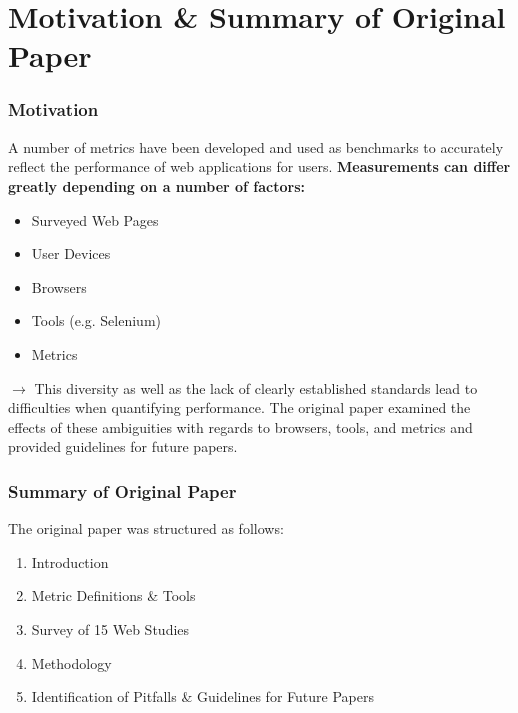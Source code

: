 \section{Motivation \& Summary of Original Paper}

\begin{frame}
    \frametitle{Motivation}
    A number of metrics have been developed and used as benchmarks to accurately reflect the performance of web applications for users. \textbf{Measurements can differ greatly depending on a number of factors:}
    \begin{itemize}
        \item Surveyed Web Pages
        \item User Devices
        \item Browsers
        \item Tools (e.g. Selenium)
        \item Metrics
    \end{itemize}
    $\boldsymbol{\rightarrow}$ This diversity as well as the lack of clearly established standards lead to difficulties when quantifying performance. The original paper \cite{10.1007/978-3-030-15986-3_19} examined the effects of these ambiguities with regards to browsers, tools, and metrics and provided guidelines for future papers.
\end{frame}

\begin{frame}
    \frametitle{Summary of Original Paper}
	The original paper \cite{10.1007/978-3-030-15986-3_19} was structured as follows:
    \begin{enumerate}
        \item Introduction
        \item Metric Definitions \& Tools
        \item Survey of 15 Web Studies
        \item Methodology
        \item Identification of Pitfalls \& Guidelines for Future Papers
    \end{enumerate}
\end{frame}
